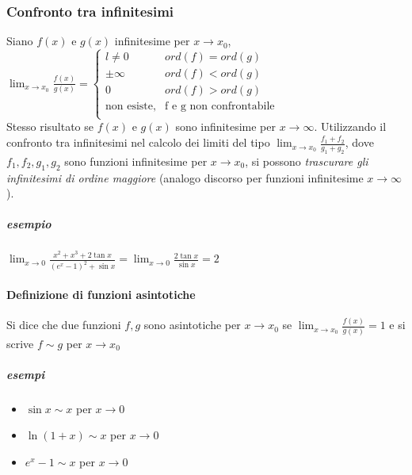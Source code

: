 \documentclass{book}
\begin{document}
\subsubsection{Confronto tra infinitesimi}
Siano $f(x)$ e $g(x)$ infinitesime per $x\to x_{0}$,\\
$\lim_{x\to x_0}\frac{f(x)}{g(x)}=
\begin{cases}
l\neq 0&ord(f)=ord(g)\\
\pm \infty&ord(f)<ord(g)\\
0&ord(f)>ord(g)\\
	\text{non esiste,} & \text{f e g non confrontabile} \\ 
\end{cases}
$\\
Stesso risultato se $f(x)$ e $g(x)$ sono infinitesime per $x\to \infty$. Utilizzando il confronto tra infinitesimi nel calcolo dei limiti del tipo $\lim_{x\to x_0}\frac{f_1+f_2}{g_1+g_2}$, dove $f_1,f_2,g_1,g_2$ sono funzioni infinitesime per $x\to x_0$, si possono {\color{blue} \em trascurare gli infinitesimi di ordine maggiore} (analogo discorso per funzioni infinitesime $x\to \infty$).
\subparagraph{esempio}
$\lim_{x\to 0}\frac{x^2+x^3+2\tan{x}}{(e^x-1)^2+\sin{x}}=\lim_{x\to 0}\frac{2\tan x}{\sin x}=2$
\paragraph{Definizione di funzioni asintotiche}
Si dice che due funzioni $f,g$ sono asintotiche per $x\to x_0$ se $\lim_{x\to x_0}\frac{f(x)}{g(x)}=1$ e si scrive $f\sim g$ per $x\to x_0$
\subparagraph{esempi}
\begin{itemize}
	\item $\sin x\sim x$ per $x\to 0$
	\item $\ln(1+x)\sim x$ per $x\to 0$
	\item $e^x-1\sim x$ per $x\to 0$ 
\end{itemize}
\end{document}
